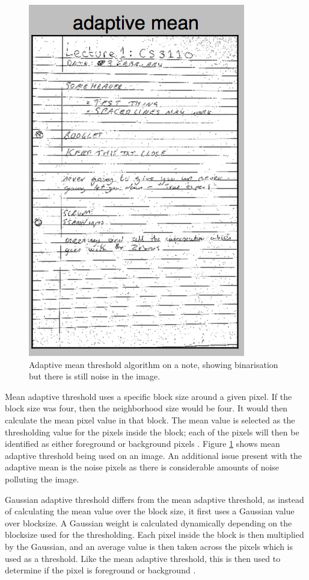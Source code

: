 \begin{figure}[H]
  \centering
  \includegraphics{images/adaptive_mean}
  \caption{Adaptive mean threshold algorithm on a note, showing binarisation but there is still noise in the image.}
  \label{fig:adaptive_mean}
\end{figure}

Mean adaptive threshold uses a specific block size around a given pixel. If the block size was four, then the neighborhood size would be four. It would then calculate the mean pixel value in that block. The mean value is selected as the thresholding value for the pixels inside the block; each of the pixels will then be identified as either foreground or background pixels \cite{citeulike:14021401}. Figure \ref{fig:adaptive_mean} shows mean adaptive threshold being used on an image. An additional issue present with the adaptive mean is the noise pixels as there is considerable amounts of noise polluting the image.

Gaussian adaptive threshold differs from the mean adaptive threshold, as instead of calculating the mean value over the block size, it first uses a Gaussian value over blocksize. A Gaussian weight is calculated dynamically depending on the blocksize used for the thresholding. Each pixel inside the block is then multiplied by the Gaussian, and an average value is then taken across the pixels which is used as a threshold. Like the mean adaptive threshold, this is then used to determine if the pixel is foreground or background \cite{bradski2008learning}\cite{citeulike:14021401}.



